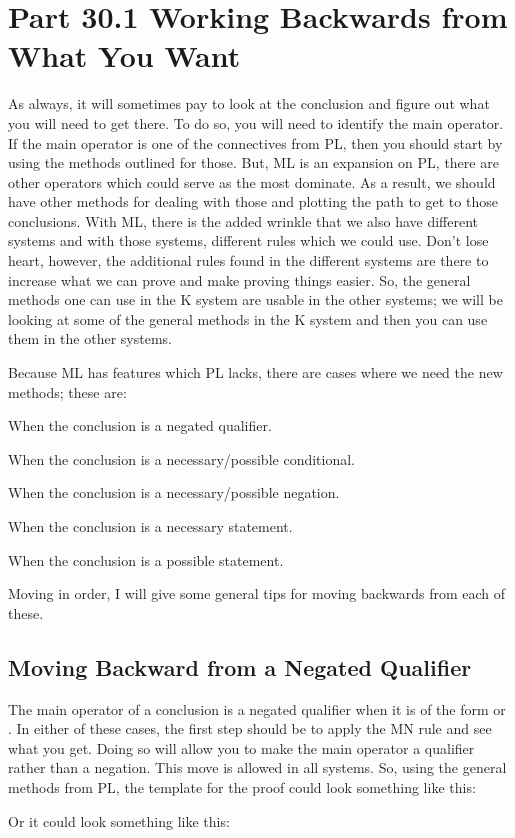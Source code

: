 \section{Part 30.1 Working Backwards from What You Want}
As always, it will sometimes pay to look at the conclusion and figure out what you will need to get there. To do so, you will need to identify the main operator. If the main operator is one of the connectives from PL, then you should start by using the methods outlined for those. But, ML is an expansion on PL, there are other operators which could serve as the most dominate. As a result, we should have other methods for dealing with those and plotting the path to get to those conclusions. With ML, there is the added wrinkle that we also have different systems and with those systems, different rules which we could use. Don't lose heart, however, the additional rules found in the different systems are there to increase what we can prove and make proving things easier. So, the general methods one can use in the K system are usable in the other systems; we will be looking at some of the general methods in the K system and then you can use them in the other systems. 

Because ML has features which PL lacks, there are cases where we need the new methods; these are:
\begin{ebullet}
\item[\textbullet]When the conclusion is a negated qualifier.
\item[\textbullet]When the conclusion is a necessary/possible conditional.
\item[\textbullet]When the conclusion is a necessary/possible negation.
\item[\textbullet]When the conclusion is a necessary statement.
\item[\textbullet]When the conclusion is a possible statement.
\end{ebullet}
Moving in order, I will give some general tips for moving backwards from each of these.
\subsection{Moving Backward from a Negated Qualifier}
The main operator of a conclusion is a negated qualifier when it is of the form \enot \ebox {} or \enot \ediamond {}. In either of these cases, the first step should be to apply the MN rule and see what you get. Doing so will allow you to make the main operator a qualifier rather than a negation. This move is allowed in all systems. So, using the general methods from PL, the template for the proof could look something like this:
\begin{fitchproof}
\ellipsesline
{}			
\ellipsesline
{}
\end{fitchproof}
Or it could look something like this:
\begin{fitchproof}
\ellipsesline
{}			
\ellipsesline
{}
\end{fitchproof}

